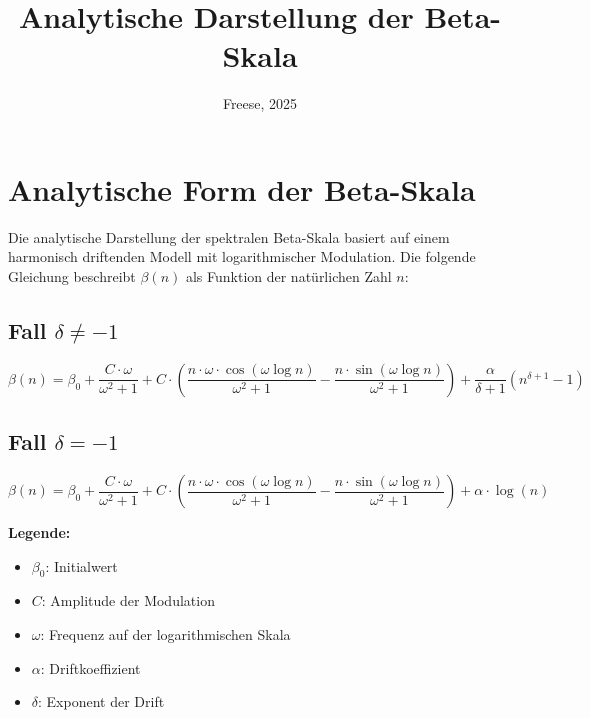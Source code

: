 \documentclass{article}
\title{Analytische Darstellung der Beta-Skala}
\author{Freese, 2025}
\date{}
\begin{document}
\maketitle

\section*{Analytische Form der Beta-Skala}

Die analytische Darstellung der spektralen Beta-Skala basiert auf einem harmonisch driftenden Modell mit logarithmischer Modulation. Die folgende Gleichung beschreibt $\beta(n)$ als Funktion der natürlichen Zahl $n$:

\subsection*{Fall $\delta \neq -1$}

\begin{equation}
\beta(n) = \beta_0 + \frac{C \cdot \omega}{\omega^2 + 1}
+ C \cdot \left( \frac{n \cdot \omega \cdot \cos(\omega \log n)}{\omega^2 + 1}
- \frac{n \cdot \sin(\omega \log n)}{\omega^2 + 1} \right)
+ \frac{\alpha}{\delta + 1} \left( n^{\delta + 1} - 1 \right)
\end{equation}

\subsection*{Fall $\delta = -1$}

\begin{equation}
\beta(n) = \beta_0 + \frac{C \cdot \omega}{\omega^2 + 1}
+ C \cdot \left( \frac{n \cdot \omega \cdot \cos(\omega \log n)}{\omega^2 + 1}
- \frac{n \cdot \sin(\omega \log n)}{\omega^2 + 1} \right)
+ \alpha \cdot \log(n)
\end{equation}

\bigskip

\noindent
\textbf{Legende:}
\begin{itemize}
  \item $\beta_0$: Initialwert
  \item $C$: Amplitude der Modulation
  \item $\omega$: Frequenz auf der logarithmischen Skala
  \item $\alpha$: Driftkoeffizient
  \item $\delta$: Exponent der Drift
\end{itemize}
\end{document}
